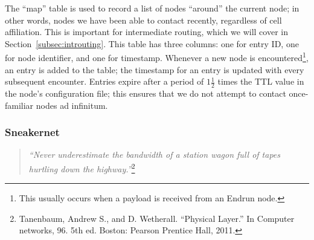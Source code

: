 \documentclass[12pt]{article}
\begin{document}
  The ``map'' table is used to record a list of nodes ``around'' the current node; in other words, nodes we have been able to contact recently, regardless of cell affiliation. This is important for intermediate routing, which we will cover in Section~\ref{subsec:introuting}. This table has three columns: one for entry ID, one for node identifier, and one for timestamp.  Whenever a new node is encountered\footnote{This usually occurs when a payload is received from an Endrun node.}, an entry is added to the table; the timestamp for an entry is updated with every subsequent encounter. Entries expire after a period of $1\frac{1}{2}$ times the TTL value in the node's configuration file; this ensures that we do not attempt to contact once-familiar nodes ad infinitum.
  
  \subsubsection{Sneakernet}
  
   \begin{quote}
    \emph{``Never underestimate the bandwidth of a station wagon full of tapes hurtling down the highway.''}\footnote{Tanenbaum, Andrew S., and D. Wetherall. ``Physical Layer.'' In Computer networks, 96. 5th ed. Boston: Pearson Prentice Hall, 2011.}
  \end{quote}
\end{document}
